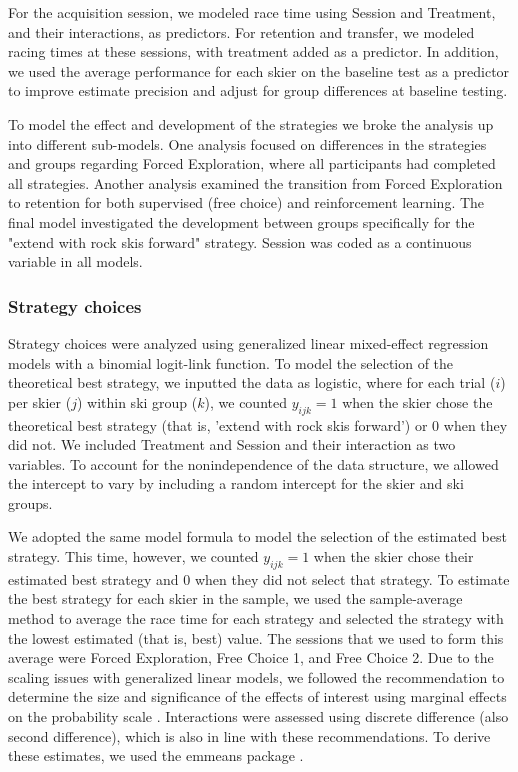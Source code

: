\documentclass[pdflatex,sn-nature]{sn-jnl}%
\theoremstyle{thmstyleone}%
\theoremstyle{thmstyletwo}%
\theoremstyle{thmstylethree}%
\begin{document}
For the acquisition session, we modeled race time using Session and Treatment, and their interactions, as predictors. For retention and transfer, we modeled racing times at these sessions, with treatment added as a predictor. In addition, we used the average performance for each skier on the baseline test as a predictor to improve estimate precision and adjust for group differences at baseline testing. 

To model the effect and development of the strategies we broke the analysis up into different sub-models. One analysis focused on differences in the strategies and groups regarding Forced Exploration, where all participants had completed all strategies. Another analysis examined the transition from Forced Exploration to retention for both supervised (free choice) and reinforcement learning. The final model investigated the development between groups specifically for the "extend with rock skis forward" strategy. Session was coded as a continuous variable in all models. 

\subsubsection{Strategy choices}
Strategy choices were analyzed using generalized linear mixed-effect regression models with a binomial logit-link function. To model the selection of the theoretical best strategy, we inputted the data as logistic, where for each trial (\(i\)) per skier (\(j\)) within ski group (\(k\)), we counted \(y_{ijk}=1\) when the skier chose the theoretical best strategy (that is, 'extend with rock skis forward') or 0 when they did not. We included Treatment and Session and their interaction as two variables. To account for the nonindependence of the data structure, we allowed the intercept to vary by including a random intercept for the skier and ski groups.

We adopted the same model formula to model the selection of the estimated best strategy. This time, however, we counted \(y_{ijk}=1\) when the skier chose their estimated best strategy and 0 when they did not select that strategy. To estimate the best strategy for each skier in the sample, we used the sample-average method \cite{sutton_reinforcement_2018} to average the race time for each strategy and selected the strategy with the lowest estimated (that is, best) value. The sessions that we used to form this average were Forced Exploration, Free Choice 1, and Free Choice 2.  Due to the scaling issues with generalized linear models, we followed the recommendation to determine the size and significance of the effects of interest using marginal effects on the probability scale \cite{mize_best_2019, mccabe_interpreting_2022}. Interactions were assessed using discrete difference (also second difference), which is also in line with these recommendations. To derive these estimates, we used the emmeans package \cite{lenth_emmeans_2023}.
\end{document}
